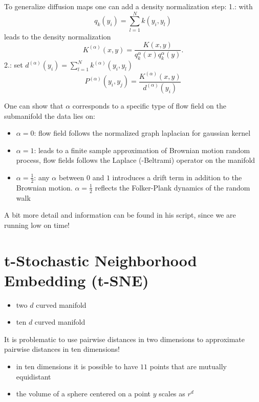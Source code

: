 To generalize diffusion maps one can add a density normalization step:
1.: with
\[q_k(y_i)=\sum_{l=1}^{N}k(y_i,y_l)\]
leads to the density normalization
\[K^{(\alpha)}(x,y)=\frac{K(x,y)}{q_k^{\alpha}(x)q_k^{\alpha}(y)}.\]
2.: set $d^{(\alpha)}(y_i)=\sum_{l=1}^N k^{(\alpha)}(y_i,y_l)$
\[P^{(\alpha)}(y_i,y_j)=\frac{K^{(\alpha)}(x,y)}{d^{(\alpha)}(y_i)}\]

\begin{remark}
    One can show that $\alpha$ corresponds to a specific type of flow field on the submanifold the data lies on:
    \begin{itemize}
        \item $\alpha=0$: flow field follows the normalized graph laplacian for gaussian kernel 
        \item $\alpha=1$: leads to a finite sample approximation of Brownian motion random process, flow fields follows the Laplace (-Beltrami) operator on the manifold 
        \item $\alpha=\frac{1}{2}$: any $\alpha$ between $0$ and $1$ introduces a drift term in addition to the Brownian motion. $\alpha=\frac{1}{2}$ reflects the 
              Folker-Plank dynamics of the random walk   
    \end{itemize}
\end{remark}

\begin{aremark}
    A bit more detail and information can be found in his script, since we are running low on time!    
\end{aremark}

\section{t-Stochastic Neighborhood Embedding (t-SNE)}

\begin{itemize}
    \item two $d$ curved manifold
    \item ten $d$ curved manifold 
\end{itemize}

It is problematic to use pairwise distances in two dimensions to approximate pairwise distances in ten dimensions!

\begin{itemize}
    \item in ten dimensions it is possible to have $11$ points that are mutually equidistant 
    \item the volume of a sphere centered on a point $y$ scales as $r^d$
\end{itemize}

